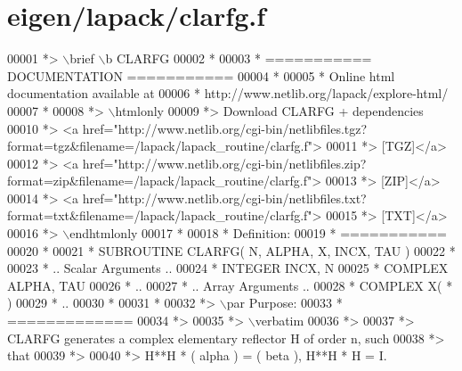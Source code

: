\hypertarget{eigen_2lapack_2clarfg_8f_source}{}\section{eigen/lapack/clarfg.f}
\label{eigen_2lapack_2clarfg_8f_source}

\begin{DoxyCode}
00001 \textcolor{comment}{*> \(\backslash\)brief \(\backslash\)b CLARFG}
00002 \textcolor{comment}{*}
00003 \textcolor{comment}{*  =========== DOCUMENTATION ===========}
00004 \textcolor{comment}{*}
00005 \textcolor{comment}{* Online html documentation available at }
00006 \textcolor{comment}{*            http://www.netlib.org/lapack/explore-html/ }
00007 \textcolor{comment}{*}
00008 \textcolor{comment}{*> \(\backslash\)htmlonly}
00009 \textcolor{comment}{*> Download CLARFG + dependencies }
00010 \textcolor{comment}{*> <a
       href="http://www.netlib.org/cgi-bin/netlibfiles.tgz?format=tgz&filename=/lapack/lapack\_routine/clarfg.f"> }
00011 \textcolor{comment}{*> [TGZ]</a> }
00012 \textcolor{comment}{*> <a
       href="http://www.netlib.org/cgi-bin/netlibfiles.zip?format=zip&filename=/lapack/lapack\_routine/clarfg.f"> }
00013 \textcolor{comment}{*> [ZIP]</a> }
00014 \textcolor{comment}{*> <a
       href="http://www.netlib.org/cgi-bin/netlibfiles.txt?format=txt&filename=/lapack/lapack\_routine/clarfg.f"> }
00015 \textcolor{comment}{*> [TXT]</a>}
00016 \textcolor{comment}{*> \(\backslash\)endhtmlonly }
00017 \textcolor{comment}{*}
00018 \textcolor{comment}{*  Definition:}
00019 \textcolor{comment}{*  ===========}
00020 \textcolor{comment}{*}
00021 \textcolor{comment}{*       SUBROUTINE CLARFG( N, ALPHA, X, INCX, TAU )}
00022 \textcolor{comment}{* }
00023 \textcolor{comment}{*       .. Scalar Arguments ..}
00024 \textcolor{comment}{*       INTEGER            INCX, N}
00025 \textcolor{comment}{*       COMPLEX            ALPHA, TAU}
00026 \textcolor{comment}{*       ..}
00027 \textcolor{comment}{*       .. Array Arguments ..}
00028 \textcolor{comment}{*       COMPLEX            X( * )}
00029 \textcolor{comment}{*       ..}
00030 \textcolor{comment}{*  }
00031 \textcolor{comment}{*}
00032 \textcolor{comment}{*> \(\backslash\)par Purpose:}
00033 \textcolor{comment}{*  =============}
00034 \textcolor{comment}{*>}
00035 \textcolor{comment}{*> \(\backslash\)verbatim}
00036 \textcolor{comment}{*>}
00037 \textcolor{comment}{*> CLARFG generates a complex elementary reflector H of order n, such}
00038 \textcolor{comment}{*> that}
00039 \textcolor{comment}{*>}
00040 \textcolor{comment}{*>       H**H * ( alpha ) = ( beta ),   H**H * H = I.}

\end{DoxyCode}
